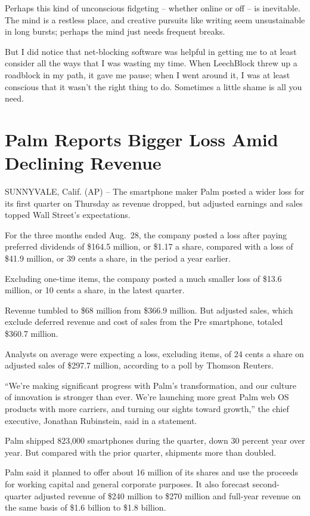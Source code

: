 ﻿\documentclass[12pt]{article}
\begin{document}
Perhaps this kind of unconscious fidgeting -- whether online or off -- is inevitable. The mind is a
restless place, and creative pursuits like writing seem unsustainable in long bursts; perhaps the
mind just needs frequent breaks.

But I did notice that net-blocking software was helpful in getting me to at least consider all the
ways that I was wasting my time. When LeechBlock threw up a roadblock in my path, it gave me pause;
when I went around it, I was at least conscious that it wasn't the right thing to do. Sometimes a
little shame is all you need.

\section{Palm Reports Bigger Loss Amid Declining Revenue}

\lettrine{S}{UNNYVALE}, Calif. (AP) -- The smartphone maker Palm posted a wider loss for its first
quarter on Thursday as revenue dropped, but adjusted earnings and sales topped Wall Street's
expectations.

For the three months ended Aug.~28, the company posted a loss after paying preferred dividends of
\$164.5 million, or \$1.17 a share, compared with a loss of \$41.9 million, or 39 cents a share, in
the period a year earlier.

Excluding one-time items, the company posted a much smaller loss of \$13.6 million, or 10 cents a
share, in the latest quarter.

Revenue tumbled to \$68 million from \$366.9 million. But adjusted sales, which exclude deferred
revenue and cost of sales from the Pre smartphone, totaled \$360.7 million.

Analysts on average were expecting a loss, excluding items, of 24 cents a share on adjusted sales of
\$297.7 million, according to a poll by Thomson Reuters.

``We're making significant progress with Palm's transformation, and our culture of innovation is
stronger than ever. We're launching more great Palm web OS products with more carriers, and turning
our sights toward growth,'' the chief executive, Jonathan Rubinstein, said in a statement.

Palm shipped 823,000 smartphones during the quarter, down 30 percent year over year. But compared
with the prior quarter, shipments more than doubled.

Palm said it planned to offer about 16 million of its shares and use the proceeds for working
capital and general corporate purposes. It also forecast second-quarter adjusted revenue of \$240
million to \$270 million and full-year revenue on the same basis of \$1.6 billion to \$1.8 billion.
\end{document}
